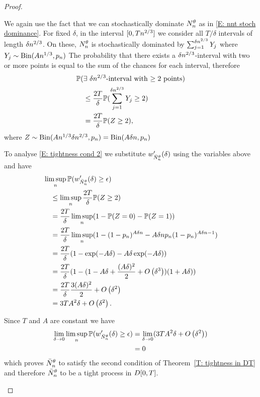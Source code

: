 \begin{proof}
\begin{proofpart}
We again use the fact that we can stochastically dominate $N_n^{\theta}$ as in \eqref{E: nnt stoch dominance}.
For fixed $\delta$, in the interval $[0, Tn^{2 / 3}]$ we consider all $T/\delta$ intervals of length $\delta n^{2 / 3}$.
On these, $N_n^{\theta}$ is stochastically dominated by $\sum_{j = 1}^{\delta n^{2 / 3}} Y_j$ where $Y_j \sim \operatorname*{Bin}(An^{1 / 3}, p_n)$
The probability that there exists a $\delta n^{2 / 3}$-interval with two or more points is equal to the sum of the chances for each interval,
therefore
\begin{equation}
\begin{aligned}
&\mathbb{P}( \text{$\exists$ $\delta n^{2 / 3}$-interval with $\geq 2$ points} ) \\
&\quad\leq \frac{2T}{\delta} \mathbb{P}( \sum_{j = 1}^{\delta n^{2 / 3}} Y_j \geq 2 ) \\
&\quad=  \frac{2T}{\delta} \mathbb{P}( Z \geq 2 ),
\end{aligned}
\end{equation}
where $Z \sim \operatorname*{Bin}(An^{1 / 3}\delta n^{2 / 3}, p_n) = \operatorname*{Bin}(A\delta n, p_n)$

To analyse \eqref{E: tightness cond 2} we substitute $w'_{\bar{N}_n^{\theta}}(\delta)$ using the variables above and have
\begin{equation}
\begin{aligned}
&\limsup_n \mathbb{P}(w'_{\bar{N}_n^{\theta}}(\delta) \geq \epsilon ) \\
&\quad\leq \limsup_n \frac{2T}{\delta} \mathbb{P}( Z \geq 2 ) \\
&\quad= \frac{2T}{\delta} \limsup_n (1 - \mathbb{P}( Z = 0 ) - \mathbb{P}( Z = 1 )) \\
&\quad= \frac{2T}{\delta} \limsup_n (1 - (1- p_n)^{A\delta n} - A\delta n p_n (1 - p_n)^{A\delta n - 1}) \\
&\quad= \frac{2T}{\delta} (1 - \exp(-A\delta) - A\delta\exp(-A\delta) ) \\
&\quad= \frac{2T}{\delta}(  1 - (1- A\delta + \frac{(A\delta)^2}{2} + O\left(\delta^3\right))(1 + A\delta ) ) \\
&\quad= \frac{2T}{\delta} \frac{3(A\delta)^2}{2} + O\left(\delta^2\right) \\
&\quad= 3TA^2\delta + O\left(\delta^2\right).
\end{aligned}
\end{equation}

Since $T$ and $A$ are constant we have
\begin{equation}
	\begin{aligned}
	\lim_{\delta \rightarrow 0} \limsup_n \mathbb{P}(w'_{\bar{N}_n^{\theta}}(\delta) \geq \epsilon ) 
	&= \lim_{\delta \rightarrow 0} ( 3TA^2\delta + O\left(\delta^2\right) )\\
	&= 0
	\end{aligned}
\end{equation}
which proves $\bar{N}_n^{\theta}$ to satisfy the second condition of Theorem~\ref{T: tightness in DT}
and therefore $\bar{N}_n^{\theta}$ to be a tight process in $D[0, T]$.


\end{proofpart}
\end{proof}
